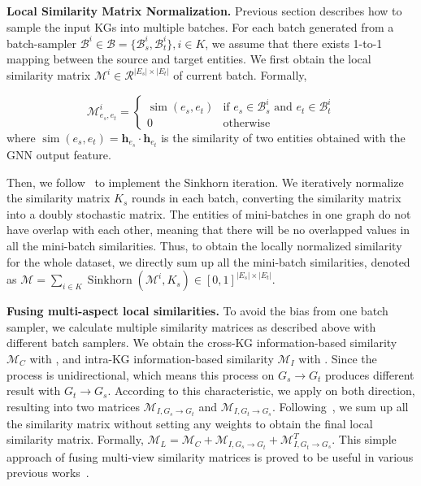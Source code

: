 \noindent
\textbf{Local Similarity Matrix Normalization.}
\label{sec:normalize-local-sim}
Previous section describes how to sample the input KGs into multiple batches. For each batch generated from a batch-sampler $\mathcal{B}^i \in \mathcal{B} = \{\mathcal{B}^i_s, \mathcal{B}^i_t\}, i \in K$,  we assume that there exists 1-to-1 mapping between the source and target entities. We first obtain the local similarity matrix $\mathcal{M}^i\in \mathcal{R}^{|E_s|\times|E_t|}$ of current batch.
Formally,

\vspace{-2mm}
\begin{equation}
   \mathcal{M}^i_{e_s, e_t}  =
    \begin{cases}
      \operatorname{sim}(e_s, e_t) & \text{if $e_s \in \mathcal{B}^i_s$ and $e_t \in \mathcal{B}^i_t$}\\
      0 & \text{otherwise}
    \end{cases}       
\end{equation}
where $\operatorname{sim}(e_{s}, e_{t})= \mathbf{h}_{e_s} \cdot \mathbf{h}_{e_t}$ is the similarity of two entities obtained with the GNN output feature.

Then, we follow~\cite{Sinkhorn13} to implement the Sinkhorn iteration. We iteratively normalize the similarity matrix $K_s$ rounds in each batch, converting the similarity matrix into a doubly stochastic matrix.
The entities of mini-batches in one graph do not have overlap with each other, meaning that there will be no overlapped values in all the mini-batch similarities. Thus, to obtain the locally normalized similarity for the whole dataset, we directly sum up all the mini-batch similarities, denoted as $\mathcal{M} = \sum_{i \in K} \operatorname{Sinkhorn} (\mathcal{M}^i, K_s) \in [0,1] ^{|E_s|\times|E_t|}$. 

\noindent
\textbf{Fusing multi-aspect local similarities.} 
To avoid the bias from one batch sampler, we calculate multiple similarity matrices as described above with different batch samplers. We obtain the cross-KG information-based similarity $\mathcal{M}_C$ with \KMeans{}, and intra-KG information-based similarity $\mathcal{M}_I$ with \MetisGCN{}.  
Since the \MetisGCN{} process is unidirectional, which means this process on $G_s \rightarrow G_t$ produces different result with $G_t \rightarrow G_s$. According to this characteristic, we apply \MetisGCN{} on both direction, resulting into two matrices $\mathcal{M}_{I, G_s\rightarrow G_t}$ and $\mathcal{M}_{I, G_t\rightarrow G_s}$. Following~\cite{CEAFF20}, we sum up all the similarity matrix without setting any weights to obtain the final local similarity matrix. Formally, $ \mathcal{M}_{L} = \mathcal{M}_C + \mathcal{M}_{I, G_s\rightarrow G_t}+ \mathcal{M}_{I, G_t\rightarrow G_s}^T$.
This simple approach of fusing multi-view similarity matrices is proved to be useful in various previous works~\cite{CEAFF20, CEAFF21, EASY21, LargeEA22}. 

